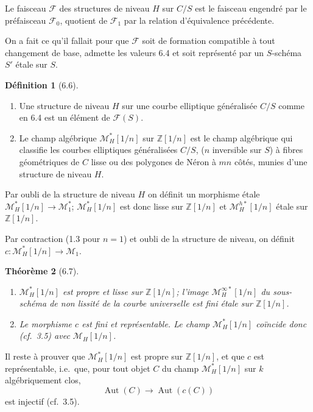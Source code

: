 \documentclass[11pt,a4paper]{amsart}
\theoremstyle{plain}
\newtheorem{theorem}{Th\'eor\`eme}[section]
\theoremstyle{definition}
\newtheorem{definition}[theorem]{D\'efinition}
\DeclareMathOperator{\Aut}{Aut}
\newcommand{\CF}{\mathcal{F}}
\newcommand{\mll}{\mathcal{M}}
\newcommand{\ZZ}{\mathbb{Z}}
\begin{document}
Le faisceau $\CF$ des structures de niveau $H$ sur $C/S$ est le faisceau engendr\'e par le pr\'efaisceau $\CF_0$, quotient de $\CF_1$ par la relation d'\'equivalence pr\'ec\'edente.

On a fait ce qu'il fallait pour que $\CF$ soit de formation compatible \`a tout changement de base, admette les valeurs 6.4 et soit repr\'esent\'e par un $S$-sch\'ema $S'$ \'etale sur $S$.

\begin{definition}[6.6] \ \begin{enumerate}[label=(\roman*)]
\item Une structure de niveau $H$ sur une courbe elliptique g\'en\'eralis\'ee $C/S$ comme en 6.4 est un \'el\'ement de $\CF(S)$.
\item Le champ alg\'ebrique $\mll^{*}_H[1/n]$ sur $\ZZ[1/n]$ est le champ alg\'ebrique qui classifie les courbes elliptiques g\'en\'eralis\'ees $C/S$, ($n$ inversible sur $S$) \`a fibres g\'eom\'etriques de $C$ lisse ou des polygones de N\'eron \`a $mn$ c\^ot\'es, munies d'une structure de niveau $H$.
\end{enumerate}
\end{definition}

Par oubli de la structure de niveau $H$ on d\'efinit un morphisme \'etale $\mll^*_H[1/n] \to \mll^*_1$; $\mll^*_H[1/n]$ est donc lisse sur $\ZZ[1/n]$ et $\mll^{h*}_H[1/n]$ \'etale sur $\ZZ[1/n]$.

Par contraction (1.3 pour $n=1$) et oubli de la structure de niveau, on d\'efinit $c \colon \mll^*_H[1/n] \to \mll_1$.

\begin{theorem}[6.7] \ \begin{enumerate}[label=(\roman*)]
\item $\mll^*_H[1/n]$ est propre et lisse sur $\ZZ[1/n]$; l'image $\mll^{\infty*}_H[1/n]$ du sous-sch\'ema de non lissit\'e de la courbe universelle est fini \'etale sur $\ZZ[1/n]$.
\item Le morphisme $c$ est fini et repr\'esentable. Le champ $\mll^*_H[1/n]$ co\"incide donc (cf.~3.5) avec $\mll_H[1/n]$.
\end{enumerate}
\end{theorem}

Il reste \`a prouver que $\mll^*_H[1/n]$ est propre sur $\ZZ[1/n]$, et que $c$ est repr\'esentable, i.e.\ que, pour tout objet $C$ du champ $\mll^*_H[1/n]$ sur $k$ alg\'ebriquement clos,
\begin{equation}\label{eq:6.7}
\Aut(C) \longrightarrow \Aut(c(C))
\end{equation}
est injectif (cf.~3.5).
\end{document}
